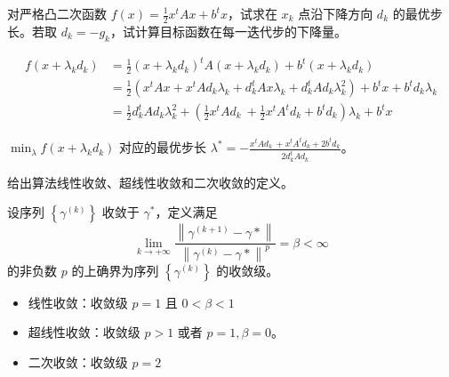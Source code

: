 \begin{problem}
    对严格凸二次函数 $f(x) = \frac{1}{2}x^tAx + b^tx$，试求在 $x_k$ 点沿下降方向 $d_k$ 的最优步长。若取 $d_k = -g_k$，试计算目标函数在每一迭代步的下降量。
 
    \solution \begin{align*}
        f(x + \lambda_kd_k) &= \frac{1}{2}(x + \lambda_kd_k)^tA(x + \lambda_kd_k) + b^t(x + \lambda_kd_k)\\
        &= \frac{1}{2}(x^tAx + x^tAd_k\lambda_k + d_k^tAx\lambda_k + d_k^tAd_k\lambda_k^2) + b^tx + b^td_k\lambda_k\\
        &=\frac{1}{2} d_k^tAd_k\lambda_k^2 + (\frac{1}{2}x^tAd_k\ + \frac{1}{2}x^tA^td_k + b^td_k)\lambda_k + b^tx
    \end{align*}

    $\min_\lambda f(x + \lambda_kd_k)$ 对应的最优步长 $\lambda^* = -\frac{x^tAd_k\ + x^tA^td_k + 2b^td_k}{2d_k^tAd_k}$。
\end{problem}

\begin{problem}
    给出算法线性收敛、超线性收敛和二次收敛的定义。

    \solution 设序列 $\left\{\gamma^{(k)}\right\}$ 收敛于 $\gamma^*$，定义满足 \[\lim _{k \rightarrow+\infty} \frac{\left\|\gamma^{(k+1)}-\gamma *\right\|}{\left\|\gamma^{(k)}-\gamma *\right\|^{p}}=\beta<\infty\] 的非负数 $p$ 的上确界为序列 $\left\{\gamma^{(k)}\right\}$ 的收敛级。
    \begin{itemize}
        \item 线性收敛：收敛级 $p = 1$ 且 $0 < \beta < 1$
        \item 超线性收敛：收敛级 $p > 1$ 或者 $p = 1, \beta = 0$。
        \item 二次收敛：收敛级 $p = 2$
    \end{itemize}
\end{problem}

